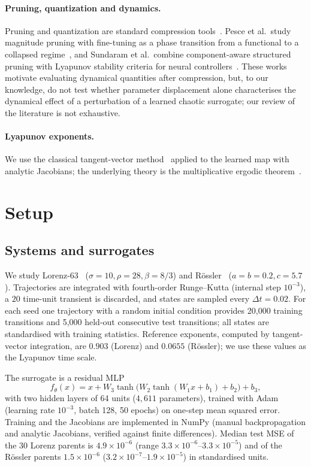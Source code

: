 \documentclass[11pt]{article}
\begin{document}
\paragraph{Pruning, quantization and dynamics.} Pruning and quantization are standard compression tools~\cite{han2015,jacob2018,hoefler2021}. Pesce et al.\ study magnitude pruning with fine-tuning as a phase transition from a functional to a collapsed regime~\cite{pesce2026}, and Sundaram et al.\ combine component-aware structured pruning with Lyapunov stability criteria for neural controllers~\cite{sundaram2025}. These works motivate evaluating dynamical quantities after compression, but, to our knowledge, do not test whether parameter displacement alone characterises the dynamical effect of a perturbation of a learned chaotic surrogate; our review of the literature is not exhaustive.

\paragraph{Lyapunov exponents.} We use the classical tangent-vector method~\cite{benettin1980,wolf1985} applied to the learned map with analytic Jacobians; the underlying theory is the multiplicative ergodic theorem~\cite{oseledets1968}.

\section{Setup}
\subsection{Systems and surrogates}
We study Lorenz-63~\cite{lorenz1963} ($\sigma=10,\rho=28,\beta=8/3$) and R\"ossler~\cite{rossler1976} ($a=b=0.2,c=5.7$). Trajectories are integrated with fourth-order Runge--Kutta (internal step $10^{-3}$), a $20$ time-unit transient is discarded, and states are sampled every $\Delta t=0.02$. For each seed one trajectory with a random initial condition provides 20{,}000 training transitions and 5{,}000 held-out consecutive test transitions; all states are standardised with training statistics. Reference exponents, computed by tangent-vector integration, are $0.903$ (Lorenz) and $0.0655$ (R\"ossler); we use these values as the Lyapunov time scale.

The surrogate is a residual MLP
\[
f_\theta(x)=x+W_3\tanh\!\big(W_2\tanh(W_1x+b_1)+b_2\big)+b_3,
\]
with two hidden layers of 64 units ($4{,}611$ parameters), trained with Adam~\cite{kingma2015} (learning rate $10^{-3}$, batch 128, 50 epochs) on one-step mean squared error. Training and the Jacobians are implemented in NumPy (manual backpropagation and analytic Jacobians, verified against finite differences). Median test MSE of the 30 Lorenz parents is $4.9\times10^{-6}$ (range $3.3\times10^{-6}$--$3.3\times10^{-5}$) and of the R\"ossler parents $1.5\times10^{-6}$ ($3.2\times10^{-7}$--$1.9\times10^{-5}$) in standardised units.
\end{document}
